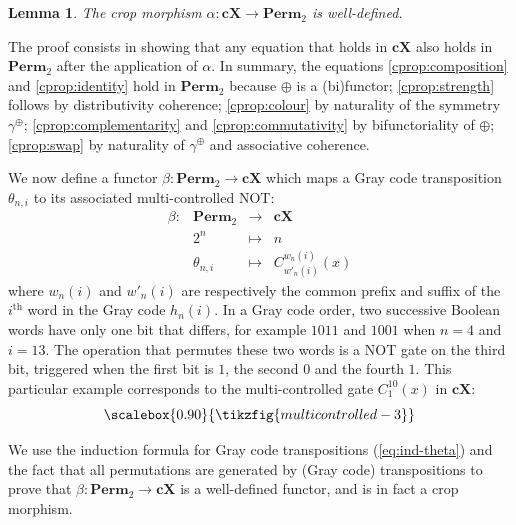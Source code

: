 \documentclass[a4paper]{article}
\theoremstyle{plain}
\newtheorem{lemma}[theorem]{Lemma}
\theoremstyle{definition}
\newcommand{\tf}[1]{\scalebox{0.90}{\tikzfig{#1}}}
\newcommand{\cat}[1]{\mathbf{#1}}
\newcommand{\ccat}[1]{\mathbf{c #1}}
\newcommand{\symplus}{\gamma^\oplus}
\begin{document}
\begin{lemma}
	\label{lem:alpha-wd}
	The crop morphism $\alpha \colon \ccat X \to \cat{Perm}_2$ is well-defined.
\end{lemma}

The proof consists in showing that any equation that holds in $\ccat X$ also
holds in $\cat{Perm}_2$ after the application of $\alpha$. In summary,
the equations \ref{cprop:composition} and \ref{cprop:identity} hold in
$\cat{Perm}_2$ because $\oplus$ is a (bi)functor; \ref{cprop:strength} follows
by distributivity coherence; \ref{cprop:colour} by naturality of the symmetry
$\symplus$; \ref{cprop:complementarity} and
\ref{cprop:commutativity} by bifunctoriality of $\oplus$; \ref{cprop:swap} by
naturality of $\symplus$ and associative coherence.

We now define a functor $\beta \colon \cat{Perm}_2 \to \ccat X$ which maps a
Gray code transposition $\theta_{n,i}$ to its associated multi-controlled NOT:
\[
	\begin{array}{lcll}
		\beta \colon & \cat{Perm}_2 & \to & \ccat X \\
		& 2^n & \mapsto & n \\
		& \theta_{n,i} & \mapsto & C^{w_n(i)}_{w'_n(i)}(x)
	\end{array}
\]
where $w_n(i)$ and $w'_n(i)$ are respectively the common prefix and suffix of
the $i^{\text{th}}$ word in the Gray code $h_n(i)$. In a Gray code order, two
successive Boolean words have only one bit that differs, for example $1011$ and
$1001$ when $n=4$ and $i=13$. The operation that permutes these two words is a
NOT gate on the third bit, triggered when the first bit is $1$, the second $0$
and the fourth $1$. This particular example corresponds to the multi-controlled
gate $C^{10}_1(x)$ in $\ccat X$:
\[
	\tf{multicontrolled-3}
\]

We use the induction formula for Gray code transpositions (\ref{eq:ind-theta})
and the fact that all permutations are generated by (Gray code) transpositions
to prove that $\beta \colon \cat{Perm}_2 \to \ccat X$ is a well-defined
functor, and is in fact a crop morphism.
\end{document}
